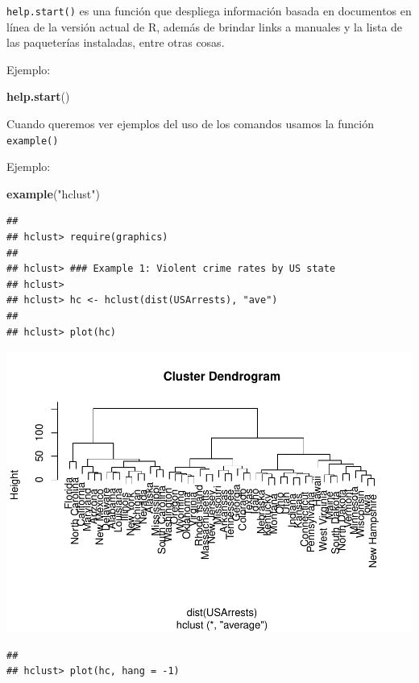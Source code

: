 \documentclass[
]{book}
\newenvironment{Shaded}{\begin{snugshade}}{\end{snugshade}}
\newcommand{\FunctionTok}[1]{\textcolor[rgb]{0.13,0.29,0.53}{\textbf{#1}}}
\newcommand{\NormalTok}[1]{#1}
\newcommand{\StringTok}[1]{\textcolor[rgb]{0.31,0.60,0.02}{#1}}
\begin{document}
\texttt{help.start()} es una función que despliega información basada en documentos en línea de la versión actual de R, además de brindar links a manuales y la lista de las paqueterías instaladas, entre otras cosas.

Ejemplo:

\begin{Shaded}
\begin{Highlighting}[]
\FunctionTok{help.start}\NormalTok{()}
\end{Highlighting}
\end{Shaded}

Cuando queremos ver ejemplos del uso de los comandos usamos la función \texttt{example()}

Ejemplo:

\begin{Shaded}
\begin{Highlighting}[]
\FunctionTok{example}\NormalTok{(}\StringTok{"hclust"}\NormalTok{)}
\end{Highlighting}
\end{Shaded}

\begin{verbatim}
## 
## hclust> require(graphics)
## 
## hclust> ### Example 1: Violent crime rates by US state
## hclust> 
## hclust> hc <- hclust(dist(USArrests), "ave")
## 
## hclust> plot(hc)
\end{verbatim}

\includegraphics{bookdown-demo_files/figure-latex/unnamed-chunk-11-1.pdf}

\begin{verbatim}
## 
## hclust> plot(hc, hang = -1)
\end{verbatim}
\end{document}

